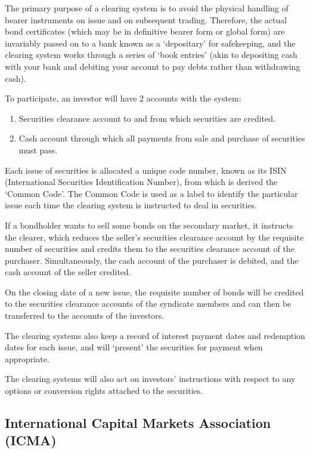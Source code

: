 \documentclass[
]{article}
\providecommand{\tightlist}{%
  \setlength{\itemsep}{0pt}\setlength{\parskip}{0pt}}
\begin{document}
The primary purpose of a clearing system is to avoid the physical
handling of bearer instruments on issue and on subsequent trading.
Therefore, the actual bond certificates (which may be in definitive
bearer form or global form) are invariably passed on to a bank known as
a `depositary' for safekeeping, and the clearing system works through a
series of `book entries' (akin to depositing cash with your bank and
debiting your account to pay debts rather than withdrawing cash).

To participate, an investor will have 2 accounts with the system:

\begin{enumerate}
\tightlist
\item
  Securities clearance account to and from which securities are
  credited.
\item
  Cash account through which all payments from sale and purchase of
  securities must pass.
\end{enumerate}

Each issue of securities is allocated a unique code number, known as its
ISIN (International Securities Identification Number), from which is
derived the `Common Code'. The Common Code is used as a label to
identify the particular issue each time the clearing system is
instructed to deal in securities.

If a bondholder wants to sell some bonds on the secondary market, it
instructs the clearer, which reduces the seller's securities clearance
account by the requisite number of securities and credits them to the
securities clearance account of the purchaser. Simultaneously, the cash
account of the purchaser is debited, and the cash account of the seller
credited.

On the closing date of a new issue, the requisite number of bonds will
be credited to the securities clearance accounts of the syndicate
members and can then be transferred to the accounts of the investors.

The clearing systems also keep a record of interest payment dates and
redemption dates for each issue, and will `present' the securities for
payment when appropriate.

The clearing systems will also act on investors' instructions with
respect to any options or conversion rights attached to the securities.

\hypertarget{international-capital-markets-association-icma}{%
\subsection{International Capital Markets Association
(ICMA)}\label{international-capital-markets-association-icma}}
\end{document}
